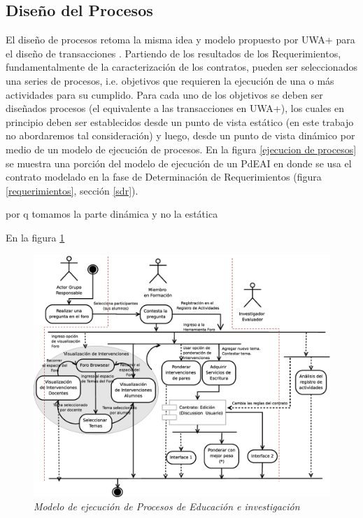 \documentclass{llncs}
\begin{document}
\subsection{Diseño del Procesos}

El diseño de procesos retoma la misma idea y modelo propuesto por UWA+ para el diseño de transacciones \cite{UWA+}. Partiendo de los resultados de los Requerimientos, fundamentalmente de la caracterización de los contratos, pueden ser seleccionados una series de procesos, i.e. objetivos que requieren la ejecución de una o más actividades para su cumplido. Para cada uno de los objetivos se deben ser diseñados procesos (el equivalente a las transacciones en UWA+), los cuales en principio deben ser establecidos desde un punto de vista estático (en este trabajo no abordaremos tal consideración) y luego, desde un punto de vista dinámico por medio de un modelo de ejecución de procesos. En la figura \ref{ejecucion de procesos} se muestra una porción del modelo de ejecución de un PdEAI en donde se usa el contrato modelado en la fase de Determinación de Requerimientos (figura \ref{requerimientos}, sección \ref{sdr}). 

por q tomamos la parte dinámica y no la estática

En la figura \ref{proceso}


\begin{figure}[!h]
        \begin{center}

	\includegraphics[width= 5 in,totalheight=3.5 in]{proceso.eps}
                                    \caption{\small \sl Modelo de ejecución de Procesos de Educación e investigación} \label{proceso}
         \end{center}
         \end{figure}
\end{document}
